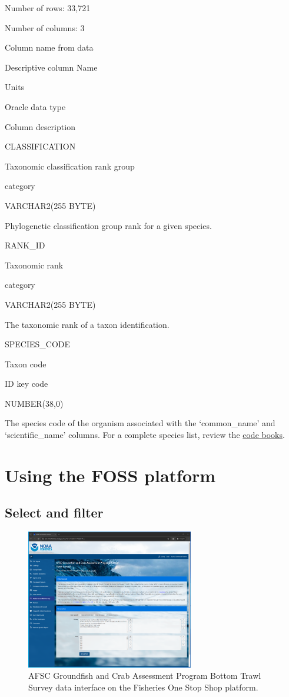 \documentclass[
  letterpaper,
  oneside,
  open=any]{scrbook}
\begin{document}
Number of rows: 33,721

Number of columns: 3

Column name from data

Descriptive column Name

Units

Oracle data type

Column description

CLASSIFICATION

Taxonomic classification rank group

category

VARCHAR2(255 BYTE)

Phylogenetic classification group rank for a given species.

RANK\_ID

Taxonomic rank

category

VARCHAR2(255 BYTE)

The taxonomic rank of a taxon identification.

SPECIES\_CODE

Taxon code

ID key code

NUMBER(38,0)

The species code of the organism associated with the `common\_name' and
`scientific\_name' columns. For a complete species list, review the
\href{https://www.fisheries.noaa.gov/resource/document/groundfish-survey-species-code-manual-and-data-codes-manual}{code
books}.

\hypertarget{using-the-foss-platform}{%
\chapter{Using the FOSS platform}\label{using-the-foss-platform}}

\hypertarget{select-and-filter}{%
\section{Select and filter}\label{select-and-filter}}

\begin{figure}

{\centering \includegraphics[width=2.87in,height=\textheight]{content/../img/foss_1_interface.png}

}

\caption{AFSC Groundfish and Crab Assessment Program Bottom Trawl Survey
data interface on the Fisheries One Stop Shop platform.}

\end{figure}
\end{document}
